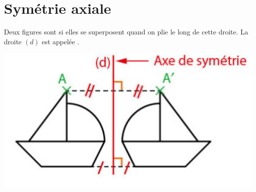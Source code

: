 \documentclass[12pt,a4paper]{article}
\date{}
\title{}
\begin{document}







\section{Symétrie axiale}


\begin{mydef}
	Deux figures sont  si elles se superposent quand on plie le long de cette droite. 
	La droite $(d)$ est appelée .
%		
%		
\end{mydef}




\begin{myex}
	\begin{center}
		\includegraphics[scale=.8]{fig1}
	\end{center}	
\end{myex}
\end{document}
